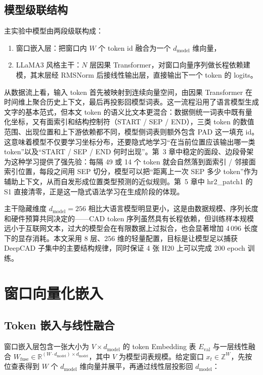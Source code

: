 \subsection{模型级联结构}

主实验中模型由两段级联构成：

\begin{enumerate}
    \item 窗口嵌入层：把窗口内 $W$ 个 token id 融合为一个 $d_{\text{model}}$ 维向量，
    \item LLaMA3 风格主干：$N$ 层因果 Transformer，对窗口向量序列做长程依赖建模，其末层经 RMSNorm 后接线性输出层，直接输出下一个 token 的 logits。
\end{enumerate}

从数据流上看，输入 token 首先被映射到连续向量空间，由因果 Transformer 在时间维上聚合历史上下文，最后再投影回模型词表。这一流程沿用了语言模型生成文字的基本范式，但本文 token 的语义比文本更混合：数据侧统一词表中既有量化坐标，又有面索引和结构控制符（START / SEP / END），三类 token 的数值范围、出现位置和上下游依赖都不同，模型侧词表则额外包含 PAD 这一填充 id。这意味着模型不仅要学习坐标分布，还要隐式地学习“在当前位置应该输出哪一类 token”以及“START / SEP / END 何时出现”。第~3 章中稳定的面段、边段骨架为这种学习提供了强先验：每隔 49 或 14 个 token 就会自然落到面索引 / 邻接面索引位置，每段之间用 SEP 切分，模型可以把“距离上一次 SEP 多少 token”作为辅助上下文，从而自发形成位置类型预测的近似规则。第~5 章中 hr2\_patch1 的 S1 直接清零，正是这一隐式语法学习在生成阶段的体现。

主干隐藏维度 $d_{\text{model}}=256$ 相比大语言模型明显更小，这是由数据规模、序列长度和硬件预算共同决定的——CAD token 序列虽然具有长程依赖，但训练样本规模远小于互联网文本，过大的模型会在有限数据上过拟合，也会显著增加 4\,096 长度下的显存消耗。本文采用 8 层、256 维的轻量配置，目标是让模型足以捕获 DeepCAD 子集中的主要结构规律，同时保证 4 张 H20 上可以完成 200 epoch 训练。

\section{窗口向量化嵌入}

\subsection{Token 嵌入与线性融合}

窗口嵌入层包含一张大小为 $V \times d_{\text{model}}$ 的 token Embedding 表 $E_{\text{val}}$ 与一层线性融合 $W_{\text{fuse}} \in \mathbb{R}^{(W \cdot d_{\text{model}}) \times d_{\text{model}}}$，其中 $V$ 为模型词表规模。给定窗口 $x_t \in \mathbb{Z}^{W}$，先按位查表得到 $W$ 个 $d_{\text{model}}$ 维向量并展平，再通过线性层投影回 $d_{\text{model}}$：

